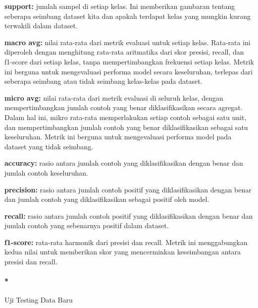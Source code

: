 \documentclass[
  letterpaper,
  DIV=11,
  numbers=noendperiod]{scrreprt}
\let\oldparagraph\paragraph
\renewcommand{\paragraph}[1]{\oldparagraph{#1}\mbox{}}
\begin{document}
\textbf{support:} jumlah sampel di setiap kelas. Ini memberikan gambaran
tentang seberapa seimbang dataset kita dan apakah terdapat kelas yang
mungkin kurang terwakili dalam dataset.

\textbf{macro avg:} nilai rata-rata dari metrik evaluasi untuk setiap
kelas. Rata-rata ini diperoleh dengan menghitung rata-rata aritmatika
dari skor presisi, recall, dan f1-score dari setiap kelas, tanpa
mempertimbangkan frekuensi setiap kelas. Metrik ini berguna untuk
mengevaluasi performa model secara keseluruhan, terlepas dari seberapa
seimbang atau tidak seimbang kelas-kelas pada dataset.

\textbf{micro avg:} nilai rata-rata dari metrik evaluasi di seluruh
kelas, dengan mempertimbangkan jumlah contoh yang benar diklasifikasikan
secara agregat. Dalam hal ini, mikro rata-rata memperlakukan setiap
contoh sebagai satu unit, dan mempertimbangkan jumlah contoh yang benar
diklasifikasikan sebagai satu keseluruhan. Metrik ini berguna untuk
mengevaluasi performa model pada dataset yang tidak seimbang.

\textbf{accuracy:} rasio antara jumlah contoh yang diklasifikasikan
dengan benar dan jumlah contoh keseluruhan.

\textbf{precision:} rasio antara jumlah contoh positif yang
diklasifikasikan dengan benar dan jumlah contoh yang diklasifikasikan
sebagai positif oleh model.

\textbf{recall:} rasio antara jumlah contoh positif yang
diklasifikasikan dengan benar dan jumlah contoh yang sebenarnya positif
dalam dataset.

\textbf{f1-score:} rata-rata harmonik dari presisi dan recall. Metrik
ini menggabungkan kedua nilai untuk memberikan skor yang mencerminkan
keseimbangan antara presisi dan recall.

\hypertarget{uji-testing-data-baru}{%
\paragraph*{Uji Testing Data Baru}\label{uji-testing-data-baru}}
\end{document}
